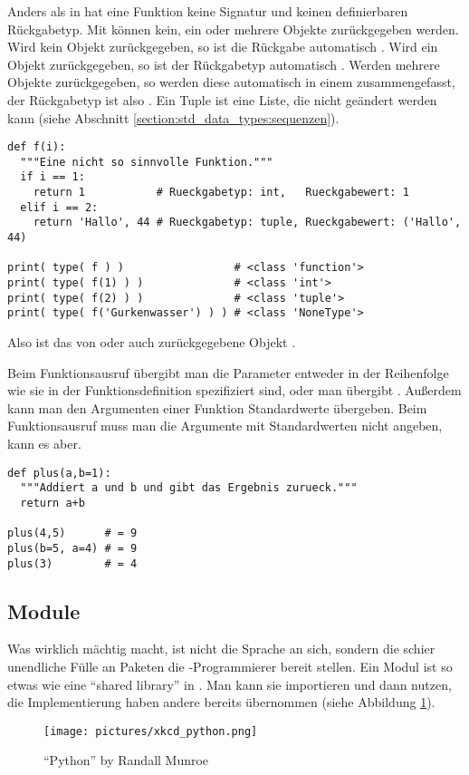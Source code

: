 Anders als in \CC hat eine Funktion keine Signatur und keinen definierbaren Rückgabetyp.
Mit  können kein, ein oder mehrere Objekte zurückgegeben werden.
Wird kein Objekt zurückgegeben, so ist die Rückgabe automatisch .
Wird ein Objekt  zurückgegeben, so ist der Rückgabetyp automatisch .
Werden mehrere Objekte zurückgegeben, so werden diese automatisch in einem  zusammengefasst, der Rückgabetyp ist also .
Ein Tuple ist eine Liste, die nicht geändert werden kann (siehe Abschnitt \ref{section:std_data_types:sequenzen}).
\begin{lstlisting}
def f(i):
  """Eine nicht so sinnvolle Funktion."""
  if i == 1:
    return 1           # Rueckgabetyp: int,   Rueckgabewert: 1
  elif i == 2:
    return 'Hallo', 44 # Rueckgabetyp: tuple, Rueckgabewert: ('Hallo', 44)

print( type( f ) )                 # <class 'function'>
print( type( f(1) ) )              # <class 'int'>
print( type( f(2) ) )              # <class 'tuple'>
print( type( f('Gurkenwasser') ) ) # <class 'NoneType'>
\end{lstlisting}
Also ist das von  oder auch  zurückgegebene Objekt .

Beim Funktionsausruf übergibt man die Parameter entweder in der Reihenfolge wie sie in der Funktionsdefinition spezifiziert sind, oder man übergibt .
Außerdem kann man den Argumenten einer Funktion Standardwerte übergeben.
Beim Funktionsausruf muss man die Argumente mit Standardwerten nicht angeben, kann es aber.
\begin{lstlisting}
def plus(a,b=1):
  """Addiert a und b und gibt das Ergebnis zurueck."""
  return a+b

plus(4,5)      # = 9
plus(b=5, a=4) # = 9
plus(3)        # = 4
\end{lstlisting}


\subsection{Module}
\label{section:crashkurs:module}
Was \Python wirklich mächtig macht, ist nicht die Sprache an sich, sondern die schier unendliche Fülle an Paketen die \Python-Programmierer bereit stellen.
Ein Modul ist so etwas wie eine ``shared library'' in \CC.
Man kann sie importieren und dann nutzen, die Implementierung haben andere bereits übernommen (siehe Abbildung \ref{figure:xkcd_python}).
\begin{figure}[ht]
  \centering
  \texttt{[image: pictures/xkcd\_python.png]}
  \caption{\label{figure:xkcd_python}``Python'' by Randall Munroe \cite{Munroe_python}}
\end{figure}

